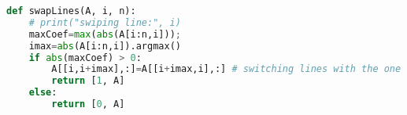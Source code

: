 \begin{lstlisting}[language=Python, style=jupycolors]
def swapLines(A, i, n):
    # print("swiping line:", i)
    maxCoef=max(abs(A[i:n,i]));
    imax=abs(A[i:n,i]).argmax()
    if abs(maxCoef) > 0:
        A[[i,i+imax],:]=A[[i+imax,i],:] # switching lines with the one which  has the maximum value
        return [1, A]
    else:
        return [0, A]
\end{lstlisting}